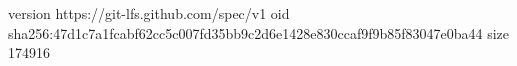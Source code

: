 version https://git-lfs.github.com/spec/v1
oid sha256:47d1c7a1fcabf62cc5c007fd35bb9c2d6e1428e830ccaf9f9b85f83047e0ba44
size 174916
